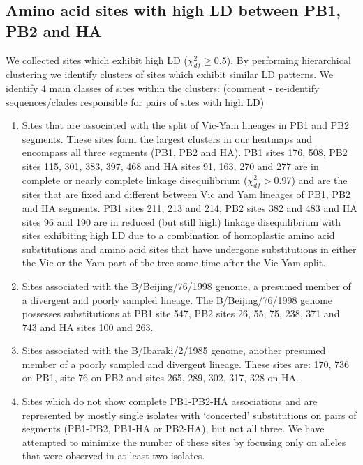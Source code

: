\documentclass[11pt,oneside,letterpaper]{article}
\begin{document}
\subsection*{Amino acid sites with high LD between PB1, PB2 and HA}
We collected sites which exhibit high LD ($\chi^{2}_{df}\ge$0.5).
By performing hierarchical clustering we identify clusters of sites which exhibit similar LD patterns.
We identify 4 main classes of sites within the clusters:
(comment - re-identify sequences/clades responsible for pairs of sites with high LD)
\begin{enumerate}
	\item Sites that are associated with the split of Vic-Yam lineages in PB1 and PB2 segments.
	These sites form the largest clusters in our heatmaps and encompass all three segments (PB1, PB2 and HA).
	PB1 sites 176, 508, PB2 sites 115, 301, 383, 397, 468 and HA sites 91, 163, 270 and 277 are in complete or nearly complete linkage disequilibrium ($\chi^{2}_{df}>$0.97) and are the sites that are fixed and different between Vic and Yam lineages of PB1, PB2 and HA segments.
	PB1 sites 211, 213 and 214, PB2 sites 382 and 483 and HA sites 96 and 190 are in reduced (but still high) linkage disequilibrium with sites exhibiting high LD due to a combination of homoplastic amino acid substitutions and amino acid sites that have undergone substitutions in either the Vic or the Yam part of the tree some time after the Vic-Yam split.
	\item Sites associated with the B/Beijing/76/1998 genome, a presumed member of a divergent and poorly sampled lineage.
	The B/Beijing/76/1998 genome possesses substitutions at PB1 site 547, PB2 sites 26, 55, 75, 238, 371 and 743 and HA sites 100 and 263.
	\item Sites associated with the B/Ibaraki/2/1985 genome, another presumed member of a poorly sampled and divergent lineage.
	These sites are: 170, 736 on PB1, site 76 on PB2 and sites 265, 289, 302, 317, 328 on HA.
	\item Sites which do not show complete PB1-PB2-HA associations and are represented by mostly single isolates with `concerted' substitutions on pairs of segments (PB1-PB2, PB1-HA or PB2-HA), but not all three.
	We have attempted to minimize the number of these sites by focusing only on alleles that were observed in at least two isolates.
\end{enumerate}
\end{document}

